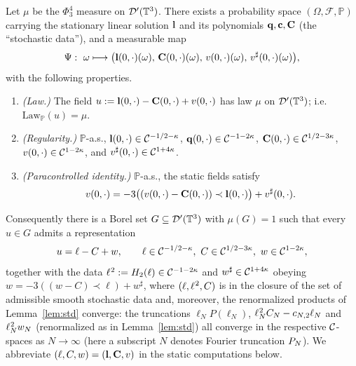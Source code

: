 \begin{qoneproposition}\label{prop:decomp}
Let $\mu$ be the $\Phi^4_3$ measure on $\mathcal{D}'(\mathbb{T}^3)$. There exists a
probability space $(\Omega,\mathcal F,\mathbb P)$ carrying the stationary linear
solution $\mathbf{l}$ and its polynomials $\mathbf{q},\mathbf{c},\mathbf{C}$ (the
``stochastic data''), and a measurable map
\[
\Psi:\ \omega\longmapsto \bigl(\qoneLin(0,\cdot)(\omega),\,\qoneIqc(0,\cdot)(\omega),\,v(0,\cdot)(\omega),\,v^\sharp(0,\cdot)(\omega)\bigr),
\]
with the following properties.
\begin{enumerate}
\item[\rm(a)] \emph{(Law.)} The field
$u:=\mathbf{l}(0,\cdot)-\mathbf{C}(0,\cdot)+v(0,\cdot)$ has law $\mu$ on
$\mathcal{D}'(\mathbb{T}^3)$; i.e.\ $\mathrm{Law}_{\mathbb P}(u)=\mu$.
\item[\rm(b)] \emph{(Regularity.)} $\mathbb P$-a.s.,
$\mathbf{l}(0,\cdot)\in\mathcal{C}^{-1/2-\kappa}$,
$\mathbf{q}(0,\cdot)\in\mathcal{C}^{-1-2\kappa}$,
$\mathbf{C}(0,\cdot)\in\mathcal{C}^{1/2-3\kappa}$,
$v(0,\cdot)\in\mathcal{C}^{1-2\kappa}$, and $v^\sharp(0,\cdot)\in\mathcal{C}^{1+4\kappa}$.
\item[\rm(c)] \emph{(Paracontrolled identity.)} $\mathbb P$-a.s., the static fields
satisfy
\begin{equation}\label{eq:v}
v(0,\cdot)=-3\bigl((v(0,\cdot)-\mathbf{C}(0,\cdot))\prec\mathbf{l}(0,\cdot)\bigr)+v^\sharp(0,\cdot).
\end{equation}
\end{enumerate}
Consequently there is a Borel set $G\subseteq\mathcal{D}'(\mathbb{T}^3)$ with $\mu(G)=1$ such
that every $u\in G$ admits a representation
\begin{equation}\label{eq:u}
u=\ell-C+w,\qquad \ell\in\qoneC^{-1/2-\kappa},\ C\in\qoneC^{1/2-3\kappa},\ w\in\qoneC^{1-2\kappa},
\end{equation}
together with the data $\ell^{\hspace{0.5pt}2}:=H_2(\ell)\in\mathcal{C}^{-1-2\kappa}$
and $w^\sharp\in\mathcal{C}^{1+4\kappa}$ obeying
$w=-3((w-C)\prec\ell)+w^\sharp$, where $(\ell,\ell^{\hspace{0.5pt}2},C)$ is in the
closure of the set of admissible smooth stochastic data and, moreover, the
renormalized products of Lemma~\ref{lem:std} converge: the truncations
$\ell_N P(\ell_N)$, $\ell^{\hspace{0.5pt}2}_N C_N-c_{N,2}\ell_N$ and
$\ell^{\hspace{0.5pt}2}_N w_N$ (renormalized as in Lemma~\ref{lem:std}) all converge
in the respective $\mathcal{C}$-spaces as $N\to\infty$ (here a subscript $N$ denotes Fourier
truncation $P_N$). We abbreviate $(\ell,C,w)=(\mathbf{l},\mathbf{C},v)$ in the static
computations below.
\end{qoneproposition}

